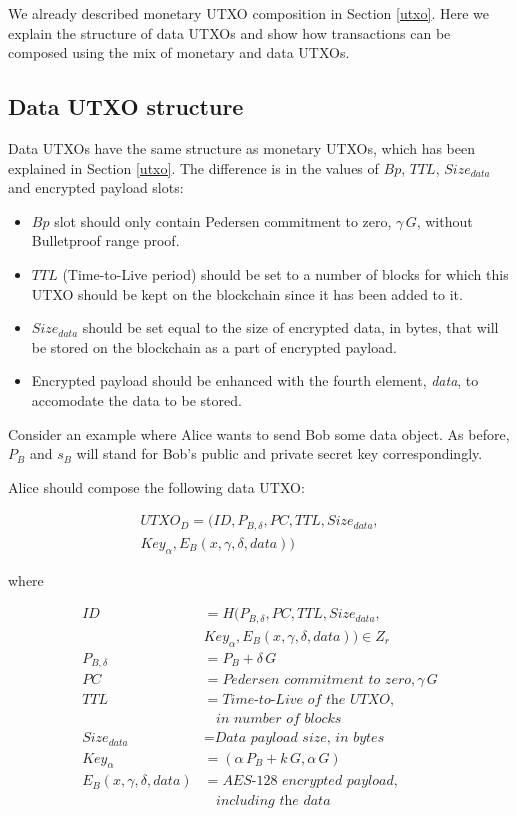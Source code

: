\documentclass[a4paper, 10pt, conference]{ieeeconf}
\begin{document}
We already described monetary UTXO composition in Section \ref{utxo}. Here we explain the structure of data UTXOs and show how transactions can be composed using the mix of monetary and data UTXOs.

\subsection{Data UTXO structure}

Data UTXOs have the same structure as monetary UTXOs, which has been explained in Section \ref{utxo}. The difference is in the values of $Bp$, $TTL$, $Size_{data}$ and encrypted payload slots:

\begin{itemize}
	\item {$Bp$ slot should only contain Pedersen commitment to zero, $\gamma \, G$, without Bulletproof range proof.}
	\item {$TTL$ (Time-to-Live period) should be set to a number of blocks for which this UTXO should be kept on the blockchain since it has been added to it.}
	\item {$Size_{data}$ should be set equal to the size of encrypted data, in bytes, that will be stored on the blockchain as a part of encrypted payload.}
	\item {Encrypted payload should be enhanced with the fourth element, \textit{data}, to accomodate the data to be stored.}
\end{itemize}

Consider an example where Alice wants to send Bob some data object. As before, $P_B$ and $s_B$ will stand for Bob's public and private secret key correspondingly. 

Alice should compose the following data UTXO:

\begin{multline*}
	UTXO_D = (ID, P_{B, \delta}, PC, TTL, Size_{data},\\
			Key_{\alpha}, E_B(x, \gamma, \delta, data))
\end{multline*}
	
	where
	
\begin{align*}
	ID &= H(P_{B, \delta}, PC, TTL, Size_{data}, \\ 
		& Key_{\alpha}, E_B(x, \gamma, \delta, data)) \in Z_r \\
	P_{B, \delta} &= P_B + \delta \, G \\
	PC &= \textit{Pedersen commitment to zero}, \gamma \, G \\
	TTL &= \textit{Time-to-Live of the UTXO},\\
	& \ \ \ \ \textit{in number of blocks} \\
	Size_{data} &= \textit{Data payload size, in bytes} \\
	Key_{\alpha} &= (\alpha \, P_{B} + k \, G, \alpha \, G ) \\
	E_B(x, \gamma, \delta, data) &= \textit{AES-128 encrypted payload}, \\
	& \ \ \ \ \textit{including the data}
\end{align*}
\end{document}
